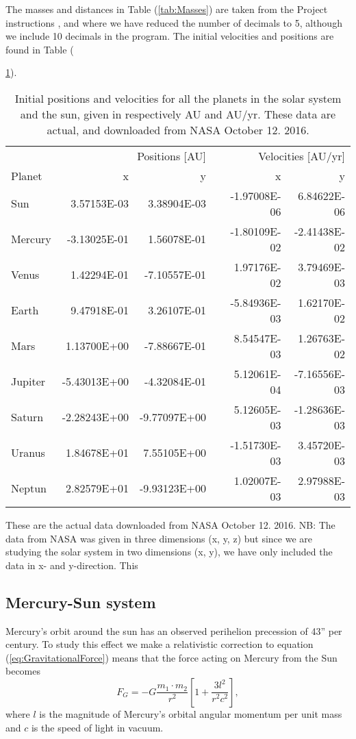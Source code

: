 \documentclass[norsk,a4paper,12pt]{article}
\begin{document}
The masses and distances in Table (\ref{tab:Masses}) are taken from the Project instructions \cite{Project_text}, and where we have reduced the number of decimals to 5, although we include 10 decimals in the program. The initial velocities and positions are found in Table ({\ref{tab:Positions}).
\begin{table}[H]
\centering
\caption{Initial positions and velocities for all the planets in the solar system and the sun, given in respectively AU and AU/yr. These data are actual, and downloaded from NASA October 12. 2016.}
\label{tab:Positions}
\begin{tabular}{lrrrrr}
\hline
\multicolumn{3}{r}{Positions [AU]} & \multicolumn{3}{r}{Velocities [AU/yr]} \\
\cline{2-3}
\cline{5-6}
Planet           & x & y &  & x & y \\
\hline
Sun          & 3.57153E-03  & 3.38904E-03  & & -1.97008E-06 & 6.84622E-06  \\
Mercury      & -3.13025E-01 & 1.56078E-01  & & -1.80109E-02 & -2.41438E-02 \\
Venus        & 1.42294E-01  & -7.10557E-01 & & 1.97176E-02  & 3.79469E-03  \\
Earth        & 9.47918E-01  & 3.26107E-01  & & -5.84936E-03 & 1.62170E-02  \\
Mars         & 1.13700E+00  & -7.88667E-01 & & 8.54547E-03  & 1.26763E-02  \\
Jupiter      & -5.43013E+00 & -4.32084E-01 & & 5.12061E-04  & -7.16556E-03 \\
Saturn       & -2.28243E+00 & -9.77097E+00 & & 5.12605E-03  & -1.28636E-03 \\
Uranus 		 & 1.84678E+01  & 7.55105E+00  & & -1.51730E-03 & 3.45720E-03  \\
Neptun 		 & 2.82579E+01  & -9.93123E+00 & & 1.02007E-03  & 2.97988E-03  \\
\hline
\end{tabular}
\end{table}
These are the actual data downloaded from NASA \cite{NASA} October 12. 2016. NB: The data from NASA was given in three dimensions (x, y, z) but since we are studying the solar system in two dimensions (x, y), we have only included the data in x- and y-direction. This \par\vspace{3mm}

\subsection{Mercury-Sun system}
Mercury's orbit around the sun has an observed perihelion precession of 43'' per century. To study this effect we make a relativistic correction to equation (\ref{eq:GravitationalForce}) means that the force acting on Mercury from the Sun becomes
\begin{equation}
F_G=-G\frac{m_1\cdot m_2}{r^2} \left[1 + \frac{3l^2}{r^2c^2}\right], 
\label{eq:GravitationalForceRelativistic}
\end{equation}
where $l$ is the magnitude of Mercury's orbital angular momentum per unit mass and $c$ is the speed of light in vacuum. 

}
\end{document}
